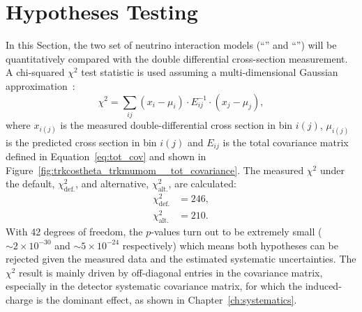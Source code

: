 \clearpage

\section{Hypotheses Testing}
\label{sec:chi2}

In this Section, the two set of neutrino interaction models (``\tuneone'' and ``\tunethree'') will be quantitatively compared with the double differential cross-section measurement. A chi-squared $\chi^2$ test statistic is used assuming a multi-dimensional Gaussian approximation~\cite{cowan}:
\begin{equation}
\chi^2 = \sum_{ij} (x_i - \mu_i) \cdot E^{-1}_{ij} \cdot (x_j - \mu_j),
\end{equation}
where $x_{i(j)}$ is the measured double-differential cross section in bin $i(j)$, $\mu_{i(j)}$ is the predicted cross section in bin $i(j)$ and $E_{ij}$ is the total covariance matrix defined in Equation~\eqref{eq:tot_cov} and shown in Figure~\ref{fig:trkcostheta_trkmumom__tot_covariance}.
The measured $\chi^2$ under the \g default, $\chi^2_\text{def.}$, and alternative, $\chi^2_\text{alt.}$, are calculated:
\begin{equation}
\begin{split}
\chi^2_\text{def.} &= 246, \\
\chi^2_\text{alt.} &= 210.
\end{split}
\end{equation}
With 42 degrees of freedom, the $p$-values turn out to be extremely small ($\sim 2\times 10^{-30}$ and $\sim 5\times 10^{-24}$ respectively) which means both hypotheses can be rejected given the measured data and the estimated systematic uncertainties. 
The $\chi^2$ result is mainly driven by off-diagonal entries in the covariance matrix, especially in the detector systematic covariance matrix, for which the induced-charge is the dominant effect, as shown in Chapter~\ref{ch:systematics}. 

